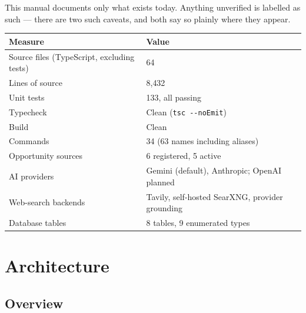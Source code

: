 \documentclass[11pt,a4paper]{report}
\newcommand{\dash}{---}
\begin{document}
This manual documents only what exists today. Anything unverified is labelled
as such \dash{} there are two such caveats, and both say so plainly where they
appear.

\begin{center}
\begin{tabular}{@{}ll@{}}
\toprule
\textbf{Measure} & \textbf{Value} \\
\midrule
Source files (TypeScript, excluding tests) & 64 \\
Lines of source & 8{,}432 \\
Unit tests & 133, all passing \\
Typecheck & Clean (\texttt{tsc -{}-noEmit}) \\
Build & Clean \\
Commands & 34 (63 names including aliases) \\
Opportunity sources & 6 registered, 5 active \\
AI providers & Gemini (default), Anthropic; OpenAI planned \\
Web-search backends & Tavily, self-hosted SearXNG, provider grounding \\
Database tables & 8 tables, 9 enumerated types \\
\bottomrule
\end{tabular}
\end{center}

\chapter{Architecture}

\section{Overview}
\end{document}
